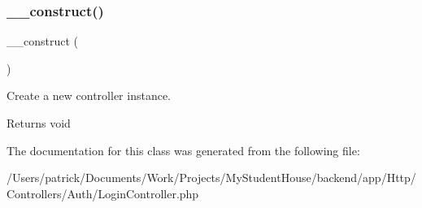 \subsubsection{\texorpdfstring{\_\_construct()}{\_\_construct()}}
{\footnotesize\ttfamily \+\_\+\+\_\+construct (\begin{DoxyParamCaption}{ }\end{DoxyParamCaption})}

Create a new controller instance.

\begin{DoxyReturn}{Returns}
void 
\end{DoxyReturn}


The documentation for this class was generated from the following file\+:\begin{DoxyCompactItemize}
\item 
/\+Users/patrick/\+Documents/\+Work/\+Projects/\+My\+Student\+House/backend/app/\+Http/\+Controllers/\+Auth/Login\+Controller.\+php\end{DoxyCompactItemize}
